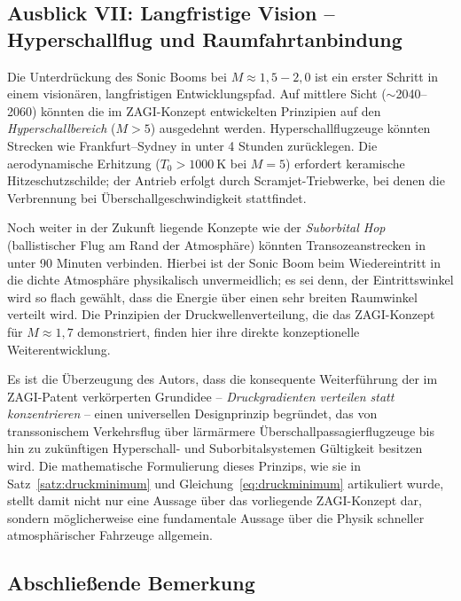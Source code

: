 ﻿\documentclass[12pt,a4paper]{article}
\theoremstyle{definition}
\theoremstyle{remark}
\begin{document}
\subsection{Ausblick VII: Langfristige Vision -- Hyperschallflug und Raumfahrtanbindung}
\label{sec:ausblick_hyperschall}

Die Unterdrückung des Sonic Booms bei $M \approx 1{,}5{-}2{,}0$ ist ein erster Schritt
in einem visionären, langfristigen Entwicklungspfad. Auf mittlere Sicht ($\sim$2040--2060)
könnten die im ZAGI-Konzept entwickelten Prinzipien auf den \emph{Hyperschallbereich}
($M > 5$) ausgedehnt werden. Hyperschallflugzeuge könnten Strecken wie
Frankfurt--Sydney in unter 4 Stunden zurücklegen. Die aerodynamische Erhitzung
($T_0 > \SI{1000}{\kelvin}$ bei $M = 5$) erfordert keramische Hitzeschutzschilde;
der Antrieb erfolgt durch Scramjet-Triebwerke, bei denen die Verbrennung bei
Überschallgeschwindigkeit stattfindet.

Noch weiter in der Zukunft liegende Konzepte wie der \emph{Suborbital Hop}
(ballistischer Flug am Rand der Atmosphäre) könnten Transozeanstrecken in
unter 90 Minuten verbinden. Hierbei ist der Sonic Boom beim Wiedereintritt
in die dichte Atmosphäre physikalisch unvermeidlich; es sei denn, der Eintrittswinkel
wird so flach gewählt, dass die Energie über einen sehr breiten Raumwinkel verteilt wird.
Die Prinzipien der Druckwellenverteilung, die das ZAGI-Konzept für $M \approx 1{,}7$
demonstriert, finden hier ihre direkte konzeptionelle Weiterentwicklung.

Es ist die Überzeugung des Autors, dass die konsequente Weiterführung der im
ZAGI-Patent verkörperten Grundidee -- \emph{Druckgradienten verteilen statt
konzentrieren} -- einen universellen Designprinzip begründet, das von
transsonischem Verkehrsflug über lärmärmere Überschallpassagierflugzeuge bis
hin zu zukünftigen Hyperschall- und Suborbitalsystemen Gültigkeit besitzen wird.
Die mathematische Formulierung dieses Prinzips, wie sie in Satz~\ref{satz:druckminimum}
und Gleichung~\eqref{eq:druckminimum} artikuliert wurde, stellt damit nicht nur eine
Aussage über das vorliegende ZAGI-Konzept dar, sondern möglicherweise eine fundamentale
Aussage über die Physik schneller atmosphärischer Fahrzeuge allgemein.

\subsection{Abschließende Bemerkung}
\label{sec:abschluss}
\end{document}

